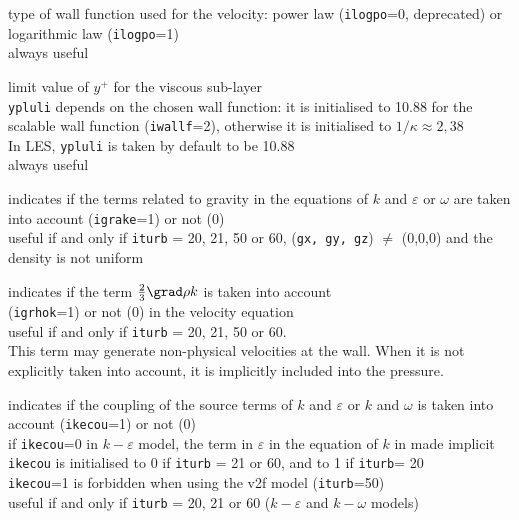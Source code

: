 {type of wall function used for the velocity: power law
({\tt ilogpo}=0, deprecated) or logarithmic law ({\tt ilogpo}=1)\\
always useful}

{limit value of $y^+$ for the viscous sub-layer\\
{\tt ypluli} depends on the chosen wall function: it is
initialised to 10.88 for the scalable wall function ({\tt iwallf}=2),
otherwise it is initialised to $1/\kappa\approx 2,38$\\
In LES, {\tt ypluli} is taken by default to be 10.88\\
always useful}


{indicates if the terms related to gravity in the
equations of $k$ and $\varepsilon$ or $\omega$ are taken into account
({\tt igrake}=1) or not (0)\\
useful if and only if {\tt iturb} = 20, 21, 50 or 60, ({\tt gx, gy, gz})
$\ne$ (0,0,0) and the density is not uniform}

{indicates if the term $\frac{2}{3}\grad \rho k$
is taken into account\\ ({\tt igrhok}=1) or not (0) in the velocity
equation\\
useful if and only if {\tt iturb} = 20, 21, 50 or 60.\\
This term may generate
non-physical velocities at the wall. When it is not explicitly taken into
account, it is implicitly included into the pressure.}

{indicates if the coupling of the source terms of
$k$ and $\varepsilon$ or $k$ and $\omega$ is taken into account
({\tt ikecou}=1) or not (0)\\
if {\tt ikecou}=0 in $k-\varepsilon$ model, the term in $\varepsilon$ in the
equation of $k$ in made implicit\\
{\tt ikecou} is initialised to 0 if {\tt iturb} = 21 or 60,
and to 1 if {\tt iturb}= 20\\
{\tt ikecou}=1 is forbidden when using the v2f model
({\tt iturb}=50)\\
useful if and only if {\tt iturb} = 20, 21 or 60 ($k-\varepsilon$ and
$k-\omega$ models)}

